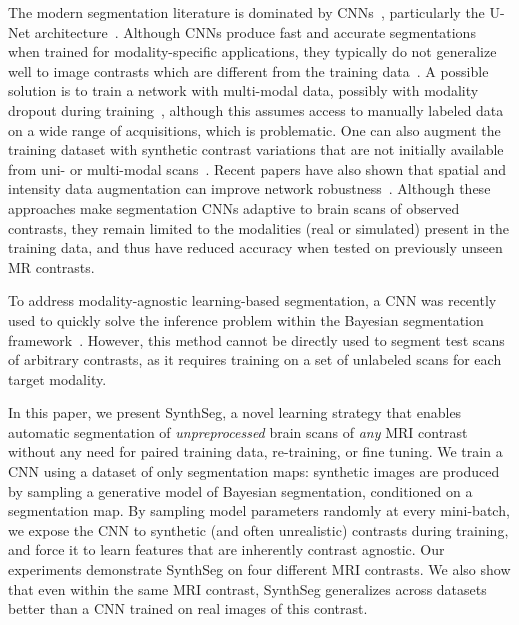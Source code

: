 \documentclass{midl}
\newcommand{\netname}{SynthSeg}
\begin{document}
The modern segmentation literature is dominated by CNNs~\cite{milletari_v-net_2016,kamnitsas_efficient_2017}, particularly the U-Net architecture~\cite{ronneberger_u-net_2015}. Although CNNs produce fast and accurate segmentations when trained for modality-specific applications, they typically do not generalize well to image contrasts which are different from the training data~\cite{akkus_deep_2017,jog_pulse_2018,karani_lifelong_2018}. A possible solution is to train a network with multi-modal data, possibly with modality dropout during training~\cite{havaei_hemis_2016}, although this assumes access to manually labeled data on a wide range of acquisitions, which is problematic. One can also augment the training dataset with synthetic contrast variations that are not initially available from uni- or multi-modal scans~\cite{chartsias_multimodal_2018,huo_synseg-net_2019,kamnitsas_unsupervised_2017,jog_pulse_2018}. Recent papers have also shown that spatial and intensity data augmentation can improve network robustness~\cite{chaitanya_semi-supervised_2019,zhao_data_2019}. Although these approaches make segmentation CNNs adaptive to brain scans of observed contrasts, they remain limited to the modalities (real or simulated) present in the training data, and thus have reduced accuracy when tested on previously unseen MR contrasts.

To address modality-agnostic learning-based segmentation, a CNN was recently used to quickly solve the inference problem within the Bayesian segmentation framework~\cite{dalca_unsupervised_2019}. However, this method cannot be directly used to segment test scans of arbitrary contrasts, as it requires training on a set of unlabeled scans for each target modality.

In this paper, we present \netname{}, a novel learning strategy that enables automatic segmentation of \textit{unpreprocessed} brain scans of \emph{any} MRI contrast without any need for paired training data, re-training, or fine tuning. We train a CNN using a dataset of only segmentation maps: synthetic images are produced by sampling a generative model of Bayesian segmentation, conditioned on a segmentation map. By sampling model parameters randomly at every mini-batch, we expose the CNN to synthetic (and often unrealistic) contrasts during training, and force it to learn features that are inherently contrast agnostic. Our experiments demonstrate \netname{} on four different MRI contrasts. We also show that even within the same MRI contrast, \netname{} generalizes across datasets better than a CNN trained on real images of this contrast.
\end{document}
